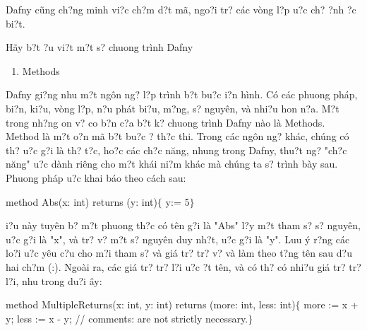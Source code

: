 \documentclass{article} %
\begin{document}
Dafny c\~{u}ng ch?ng minh vi?c ch?m d?t m\~{a}, ngo?i tr? c\'{a}c v\`{o}ng l?p {\dj}u?c ch? {\dj}?nh {\dj}?c bi?t.

\noindent H\~{a}y b?t {\dj}?u vi?t m?t s? chuong tr\`{i}nh Dafny 

\noindent 

\noindent 

\begin{enumerate}
\item  Methods
\end{enumerate}

Dafny gi?ng nhu m?t ng\^{o}n ng? l?p tr\`{i}nh b?t bu?c {\dj}i?n h\`{i}nh. C\'{o} c\'{a}c phuong ph\'{a}p, bi?n, ki?u, v\`{o}ng l?p, n?u ph\'{a}t bi?u, m?ng, s? nguy\^{e}n, v\`{a} nhi?u hon n?a. M?t trong nh?ng {\dj}on v? co b?n c?a b?t k? chuong tr\`{i}nh Dafny n\`{a}o l\`{a} Methods.  Method l\`{a} m?t {\dj}o?n m\~{a} b?t bu?c {\dj}? th?c thi. Trong c\'{a}c ng\^{o}n ng? kh\'{a}c, ch\'{u}ng c\'{o} th? {\dj}u?c g?i l\`{a} th? t?c, ho?c c\'{a}c ch?c n\u{a}ng, nhung trong Dafny, thu?t ng? "ch?c n\u{a}ng" {\dj}u?c d\`{a}nh ri\^{e}ng cho m?t kh\'{a}i ni?m kh\'{a}c m\`{a} ch\'{u}ng ta s? tr\`{i}nh b\`{a}y sau. Phuong ph\'{a}p {\dj}u?c khai b\'{a}o theo c\'{a}ch sau: 

\noindent method Abs(x: int) returns (y: int)$\{$  y:= 5$\}$

{\DJ}i?u n\`{a}y tuy\^{e}n b? m?t phuong th?c c\'{o} t\^{e}n  g?i l\`{a} "Abs" l?y m?t tham s? s? nguy\^{e}n, {\dj}u?c g?i l\`{a} "x", v\`{a} tr? v? m?t s? nguy\^{e}n duy nh?t, {\dj}u?c g?i l\`{a} "y". Luu \'{y} r?ng c\'{a}c lo?i {\dj}u?c y\^{e}u c?u cho m?i tham s? v\`{a} gi\'{a} tr? tr? v? v\`{a} l\`{a}m theo t?ng t\^{e}n sau d?u hai ch?m (:). Ngo\`{a}i ra, c\'{a}c gi\'{a} tr? tr? l?i {\dj}u?c {\dj}?t t\^{e}n, v\`{a} c\'{o} th? c\'{o} nhi?u gi\'{a} tr? tr? l?i, nhu trong du?i {\dj}\^{a}y:

\noindent method MultipleReturns(x: int, y: int) returns (more: int, less: int)$\{$   more := x + y;   less := x - y;   // comments: are not strictly necessary.$\}$
\end{document}
